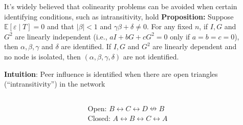 \documentclass[final]{beamer}
\newlength{\sepwidth}
\newlength{\colwidth}
\newcommand{\separatorcolumn}{\begin{column}{\sepwidth}\end{column}}
\begin{document}
\begin{frame}[t]
\begin{columns}[t]
\begin{column}{\colwidth}
\begin{block}{It's widely believed that colinearity problems can be avoided when certain identifying conditions, such as intransitivity, hold}
                \textbf{Proposition:}
                Suppose $\mathbb E[\varepsilon \mid T] = 0$ and that $|\beta| < 1$ and $\gamma \beta + \delta \neq 0$. For any fixed $n$, if $I, G$ and $G^2$ are linearly independent (i.e., $a I + b G + c G^2 = 0$ only if $a = b = c = 0$), then $\alpha, \beta, \gamma$ and $\delta$ are identified. If $I, G$ and $G^2$ are linearly dependent and no node is isolated, then $(\alpha, \beta, \gamma, \delta)$ are not identified.

                \textbf{Intuition}: Peer influence is identified when there are \textcolor{Mahogany}{open triangles} (``intransitivity'') in the network
                \vspace{8mm}
                \begin{columns}
                    \begin{column}{0.5\textwidth}
                        \centering
                    \end{column}
                    \begin{column}{0.5\textwidth}
                        \centering
                        Open: \textcolor{Mahogany}{$B \leftrightarrow C \leftrightarrow D \nleftrightarrow B$} \\
                        Closed: $A \leftrightarrow B \leftrightarrow C \leftrightarrow A$
                    \end{column}
                \end{columns}
            \end{block}

        \end{column}

        \separatorcolumn

        \begin{column}{\colwidth}



\end{column}
\end{columns}
\end{frame}
\end{document}
